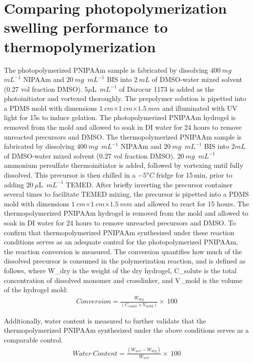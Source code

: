 \section{Comparing photopolymerization swelling performance to thermopolymerization}
The photopolymerized PNIPAAm sample is fabricated by dissolving $400~mg$~$mL^{-1}$ NIPAAm and $20~mg$~$mL^{-1}$ BIS into $2~mL$ of DMSO-water mixed solvent (0.27 vol fraction DMSO). $5\mu$L~$mL^{-1}$ of Darocur 1173 is added as the photoinitiator and vortexed thoroughly. The prepolymer solution is pipetted into a PDMS mold with dimensions $1~cm$$\times$$1~cm$$\times$$1.5~mm$ and illuminated with UV light for 15s to induce gelation. The photopolymerized PNIPAAm hydrogel is removed from the mold and allowed to soak in DI water for 24 hours to remove unreacted precursors and DMSO. The thermopolymerized PNIPAAm sample is fabricated by dissolving $400~mg$~$mL^{-1}$ NIPAAm and $20~mg$~$mL^{-1}$ BIS into $2mL$ of DMSO-water mixed solvent (0.27 vol fraction DMSO). $20~mg$~$mL^{-1}$ ammonium persulfate thermoinitiator is added, followed by vortexing until fully dissolved. This precursor is then chilled in a $-5^{o}C$ fridge for 15\,min, prior to adding $20~\mu$L~$mL^{-1}$ TEMED. After briefly inverting the precursor container several times to facilitate TEMED mixing, the precursor is pipetted into a PDMS mold with dimensions $1~cm$$\times$$1~cm$$\times$$1.5~mm$ and allowed to react for 15 hours. The thermopolymerized PNIPAAm hydrogel is removed from the mold and allowed to soak in DI water for 24 hours to remove unreacted precursors and DMSO.
To confirm that thermopolymerized PNIPAAm synthesized under these reaction conditions serves as an adequate control for the photopolymerized PNIPAAm, the reaction conversion is measured. The conversion quantifies how much of the dissolved precursor is consumed in the polymerization reaction, and is defined as follows, where W_dry  is the weight of the dry hydrogel, C_solute  is the total concentration of dissolved monomer and crosslinker, and V_mold  is the volume of the hydrogel mold:
\begin{align}
	Conversion = \frac{W_{dry}}{(C_{solute}×V_{mold} )}\times~100
\end{align}

Additionally, water content is measured to further validate that the thermopolymerized PNIPAAm synthesized under the above conditions serves as a comparable control. 
\begin{align}
	Water~Content = \frac{(W_{wet}-W_{dry})}{W_{wet}}\times~100
\end{align}

